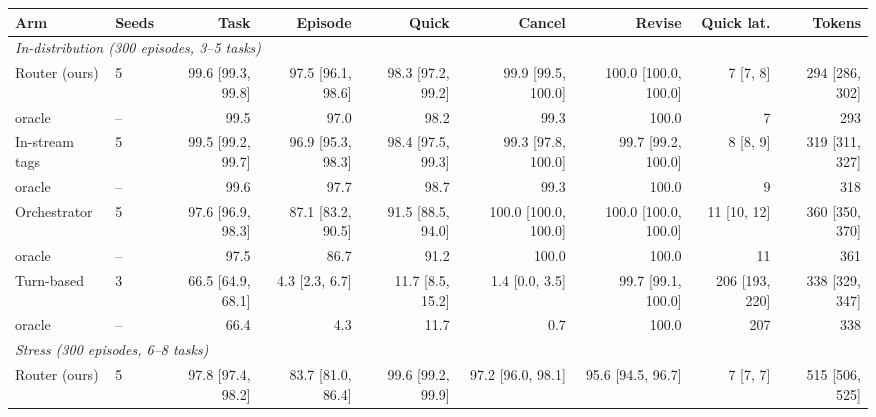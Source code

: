 \begin{tabular}{llrrrrrrr}
\toprule
Arm & Seeds & Task & Episode & Quick & Cancel & Revise & Quick lat. & Tokens \\
\midrule\multicolumn{9}{l}{\textit{In-distribution (300 episodes, 3--5 tasks)}}\\
Router (ours) & 5 & 99.6 {\scriptsize[99.3, 99.8]} & 97.5 {\scriptsize[96.1, 98.6]} & 98.3 {\scriptsize[97.2, 99.2]} & 99.9 {\scriptsize[99.5, 100.0]} & 100.0 {\scriptsize[100.0, 100.0]} & 7 {\scriptsize[7, 8]} & 294 {\scriptsize[286, 302]} \\
\quad oracle & -- & {\color{gray}99.5} & {\color{gray}97.0} & {\color{gray}98.2} & {\color{gray}99.3} & {\color{gray}100.0} & {\color{gray}7} & {\color{gray}293} \\
In-stream tags & 5 & 99.5 {\scriptsize[99.2, 99.7]} & 96.9 {\scriptsize[95.3, 98.3]} & 98.4 {\scriptsize[97.5, 99.3]} & 99.3 {\scriptsize[97.8, 100.0]} & 99.7 {\scriptsize[99.2, 100.0]} & 8 {\scriptsize[8, 9]} & 319 {\scriptsize[311, 327]} \\
\quad oracle & -- & {\color{gray}99.6} & {\color{gray}97.7} & {\color{gray}98.7} & {\color{gray}99.3} & {\color{gray}100.0} & {\color{gray}9} & {\color{gray}318} \\
Orchestrator & 5 & 97.6 {\scriptsize[96.9, 98.3]} & 87.1 {\scriptsize[83.2, 90.5]} & 91.5 {\scriptsize[88.5, 94.0]} & 100.0 {\scriptsize[100.0, 100.0]} & 100.0 {\scriptsize[100.0, 100.0]} & 11 {\scriptsize[10, 12]} & 360 {\scriptsize[350, 370]} \\
\quad oracle & -- & {\color{gray}97.5} & {\color{gray}86.7} & {\color{gray}91.2} & {\color{gray}100.0} & {\color{gray}100.0} & {\color{gray}11} & {\color{gray}361} \\
Turn-based & 3 & 66.5 {\scriptsize[64.9, 68.1]} & 4.3 {\scriptsize[2.3, 6.7]} & 11.7 {\scriptsize[8.5, 15.2]} & 1.4 {\scriptsize[0.0, 3.5]} & 99.7 {\scriptsize[99.1, 100.0]} & 206 {\scriptsize[193, 220]} & 338 {\scriptsize[329, 347]} \\
\quad oracle & -- & {\color{gray}66.4} & {\color{gray}4.3} & {\color{gray}11.7} & {\color{gray}0.7} & {\color{gray}100.0} & {\color{gray}207} & {\color{gray}338} \\
\midrule\multicolumn{9}{l}{\textit{Stress (300 episodes, 6--8 tasks)}}\\
Router (ours) & 5 & 97.8 {\scriptsize[97.4, 98.2]} & 83.7 {\scriptsize[81.0, 86.4]} & 99.6 {\scriptsize[99.2, 99.9]} & 97.2 {\scriptsize[96.0, 98.1]} & 95.6 {\scriptsize[94.5, 96.7]} & 7 {\scriptsize[7, 7]} & 515 {\scriptsize[506, 525]} \\

\end{tabular}
